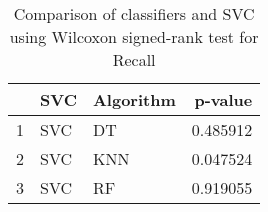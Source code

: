 \begin{table}
\footnotesize
\caption{Comparison of classifiers and SVC using Wilcoxon signed-rank test for Recall}
\label{tab:SVC wilcoxon Recall comparison}
\begin{tabular}{lllr}
\hline
 & SVC & Algorithm & p-value \\
\hline
1 & SVC & DT & 0.485912 \\
2 & SVC & KNN & 0.047524 \\
3 & SVC & RF & 0.919055 \\
\hline
\end{tabular}
\end{table}
